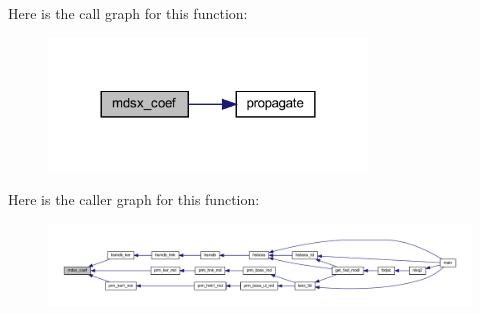 Here is the call graph for this function\+:\nopagebreak
\begin{figure}[H]
\begin{center}
\leavevmode
\includegraphics[width=240pt]{Leroi_8f90_a37f7ce2aa039b27d2452e812479745a7_cgraph}
\end{center}
\end{figure}
Here is the caller graph for this function\+:\nopagebreak
\begin{figure}[H]
\begin{center}
\leavevmode
\includegraphics[width=350pt]{Leroi_8f90_a37f7ce2aa039b27d2452e812479745a7_icgraph}
\end{center}
\end{figure}
\mbox{\label{Leroi_8f90_a4bfc3438dc7d8469c5ec8f1888d7fc50}} 
